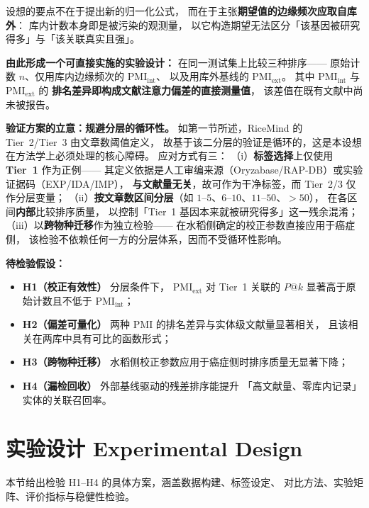 \documentclass[conference]{IEEEtran}
\begin{document}
设想的要点不在于提出新的归一化公式，
而在于主张\textbf{期望值的边缘频次应取自库外}：
库内计数本身即是被污染的观测量，
以它构造期望无法区分「该基因被研究得多」与「该关联真实且强」。

\textbf{由此形成一个可直接实施的实验设计：}
在同一测试集上比较三种排序——
原始计数 $n$、仅用库内边缘频次的 $\mathrm{PMI}_{\text{int}}$、
以及用库外基线的 $\mathrm{PMI}_{\text{ext}}$。
其中 $\mathrm{PMI}_{\text{int}}$ 与 $\mathrm{PMI}_{\text{ext}}$ 的
\textbf{排名差异即构成文献注意力偏差的直接测量值}，
该差值在既有文献中尚未被报告。

\textbf{验证方案的立意：规避分层的循环性。}
如第一节所述，RiceMind 的 Tier~2/Tier~3 由文章数阈值定义，
故基于该二分层的验证是循环的，这是本设想在方法学上必须处理的核心障碍。
应对方式有三：
（i）\textbf{标签选择}上仅使用 \textbf{Tier~1} 作为正例——
其定义依据是人工审编来源（Oryzabase/RAP-DB）或实验证据码（EXP/IDA/IMP），
\textbf{与文献量无关}，故可作为干净标签，而 Tier~2/3 仅作分层变量；
（ii）\textbf{按文章数区间分层}（如 $1$--$5$、$6$--$10$、$11$--$50$、$>50$），
在各区间\textbf{内部}比较排序质量，
以控制「Tier~1 基因本来就被研究得多」这一残余混淆；
（iii）以\textbf{跨物种迁移}作为独立检验——
在水稻侧确定的校正参数直接应用于癌症侧，
该检验不依赖任何一方的分层体系，因而不受循环性影响。

\textbf{待检验假设：}
\begin{itemize}
  \item \textbf{H1（校正有效性）} 分层条件下，
        $\mathrm{PMI}_{\text{ext}}$ 对 Tier~1 关联的 $P@k$
        显著高于原始计数且不低于 $\mathrm{PMI}_{\text{int}}$；
  \item \textbf{H2（偏差可量化）} 两种 PMI 的排名差异与实体级文献量显著相关，
        且该相关在两库中具有可比的函数形式；
  \item \textbf{H3（跨物种迁移）} 水稻侧校正参数应用于癌症侧时排序质量无显著下降；
  \item \textbf{H4（漏检回收）} 外部基线驱动的残差排序能提升
        「高文献量、零库内记录」实体的关联召回率。
\end{itemize}

\section{实验设计 Experimental Design}

本节给出检验 H1--H4 的具体方案，涵盖数据构建、标签设定、
对比方法、实验矩阵、评价指标与稳健性检验。
\end{document}
